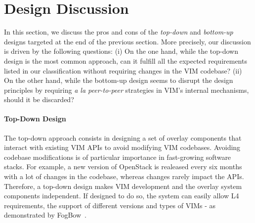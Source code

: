 
\section{Design Discussion}
\label{sec:design_discussion}

In this section, we discuss the pros and cons of the \emph{top-down} and
\emph{bottom-up} designs targeted at the end of the previous section.
More precisely, our discussion is driven by the following questions: (i) On the
one hand, while the top-down design is the most common approach, can it fulfill
all the expected requirements listed in our classification without requiring
changes in the VIM codebase? (ii) On the other hand, while the bottom-up design
seems to disrupt the design principles by requiring \emph{a la peer-to-peer}
strategies in VIM's internal mechanisms, should it be discarded?

\paragraph{Top-Down Design}
The top-down approach consists in designing a set of overlay
components that interact with existing VIM APIs to avoid modifying VIM
codebases.
%
Avoiding codebase modifications is of particular importance in
fast-growing software stacks. For example, a new version of OpenStack
is realeased every six months with a lot of changes in the codebase,
whereas changes rarely impact the APIs.
%
Therefore, a top-down design makes VIM development and the overlay
system components independent. If designed to do so, the system can
easily allow L4 requirements, \ie the support of different versions
and types of VIMs - as demonstrated by
FogBow~\cite{brasileiro2016fogbow}.

